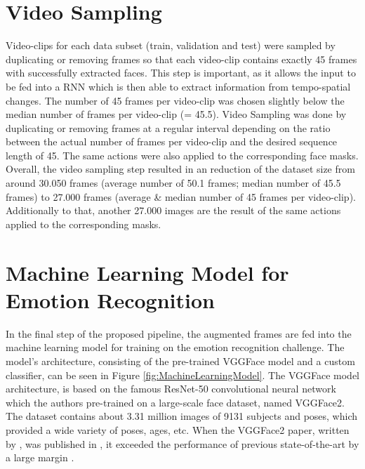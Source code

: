 \section{Video Sampling}
Video-clips for each data subset (train, validation and test) were sampled by duplicating or removing frames so that each video-clip contains exactly 45 frames with successfully extracted faces. This step is important, as it allows the input to be fed into a RNN which is then able to extract information from tempo-spatial changes.
\newline\newline
The number of 45 frames per video-clip was chosen slightly below the median number of frames per video-clip (= 45.5). Video Sampling was done by duplicating or removing frames at a regular interval depending on the ratio between the actual number of frames per video-clip and the desired sequence length of 45. The same actions were also applied to the corresponding face masks.
\newline\newline
Overall, the video sampling step resulted in an reduction of the dataset size from around 30.050 frames (average number of 50.1 frames; median number of 45.5 frames) to 27.000 frames (average \& median number of 45 frames per video-clip). Additionally to that, another 27.000 images are the result of the same actions applied to the corresponding masks.


\section{Machine Learning Model for Emotion Recognition}
In the final step of the proposed pipeline, the augmented frames are fed into the machine learning model for training on the emotion recognition challenge. The model's architecture, consisting of the pre-trained VGGFace model \citep{Cao:2018:VGGFace2} and a custom classifier, can be seen in Figure \ref{fig:MachineLearningModel}.
\newline\newline
The VGGFace model architecture, is based on the famous ResNet-50 convolutional neural network which the authors \citet{Cao:2018:VGGFace2} pre-trained on a large-scale face dataset, named VGGFace2. The dataset contains about 3.31 million images of 9131 subjects and poses, which provided a wide variety of poses, ages, etc. When the VGGFace2 paper, written by \citet{Cao:2018:VGGFace2}, was published in \citeyear{Cao:2018:VGGFace2}, it exceeded the performance of previous state-of-the-art by a large margin \citep{Cao:2018:VGGFace2}.

